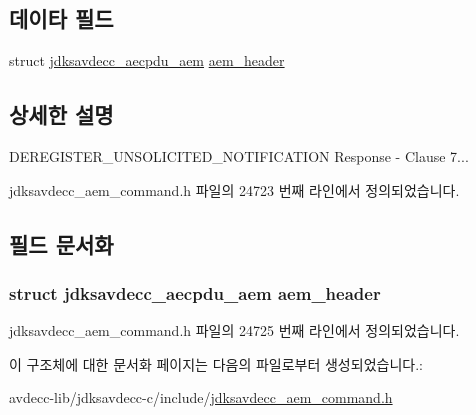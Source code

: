 \subsection*{데이타 필드}
\begin{DoxyCompactItemize}
\item 
struct \hyperlink{structjdksavdecc__aecpdu__aem}{jdksavdecc\+\_\+aecpdu\+\_\+aem} \hyperlink{structjdksavdecc__aem__command__deregister__unsolicited__notification__response_ae1e77ccb75ff5021ad923221eab38294}{aem\+\_\+header}
\end{DoxyCompactItemize}


\subsection{상세한 설명}
D\+E\+R\+E\+G\+I\+S\+T\+E\+R\+\_\+\+U\+N\+S\+O\+L\+I\+C\+I\+T\+E\+D\+\_\+\+N\+O\+T\+I\+F\+I\+C\+A\+T\+I\+ON Response -\/ Clause 7... 

jdksavdecc\+\_\+aem\+\_\+command.\+h 파일의 24723 번째 라인에서 정의되었습니다.



\subsection{필드 문서화}
\subsubsection[{\texorpdfstring{aem\+\_\+header}{aem_header}}]{\setlength{\rightskip}{0pt plus 5cm}struct {\bf jdksavdecc\+\_\+aecpdu\+\_\+aem} aem\+\_\+header}\hypertarget{structjdksavdecc__aem__command__deregister__unsolicited__notification__response_ae1e77ccb75ff5021ad923221eab38294}{}\label{structjdksavdecc__aem__command__deregister__unsolicited__notification__response_ae1e77ccb75ff5021ad923221eab38294}


jdksavdecc\+\_\+aem\+\_\+command.\+h 파일의 24725 번째 라인에서 정의되었습니다.



이 구조체에 대한 문서화 페이지는 다음의 파일로부터 생성되었습니다.\+:\begin{DoxyCompactItemize}
\item 
avdecc-\/lib/jdksavdecc-\/c/include/\hyperlink{jdksavdecc__aem__command_8h}{jdksavdecc\+\_\+aem\+\_\+command.\+h}\end{DoxyCompactItemize}
